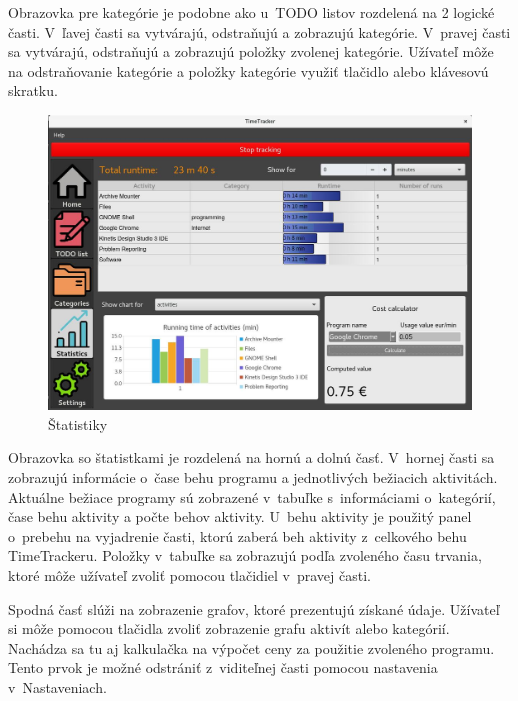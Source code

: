 \documentclass[]{article}
\begin{document}
Obrazovka pre kategórie je podobne ako u~TODO listov rozdelená na 2 logické časti. V~ľavej časti sa vytvárajú, odstraňujú a zobrazujú kategórie. V~pravej časti sa vytvárajú, odstraňujú a zobrazujú položky zvolenej kategórie. Užívateľ môže na odstraňovanie kategórie a položky kategórie využiť tlačidlo alebo klávesovú skratku.

\newpage

\begin{figure}[h!]
	\includegraphics[width=\textwidth]{statistiky}
	\caption{Štatistiky}
\end{figure}

Obrazovka so štatistkami je rozdelená na hornú a dolnú časť. V~hornej časti sa zobrazujú informácie o~čase behu programu a jednotlivých bežiacich aktivitách. Aktuálne bežiace programy sú zobrazené v~tabuľke s~informáciami o~kategórií, čase behu aktivity a počte behov aktivity. U~behu aktivity je použitý panel o~prebehu na vyjadrenie časti, ktorú zaberá beh aktivity z~celkového behu TimeTrackeru. Položky v~tabuľke sa zobrazujú podľa zvoleného času trvania, ktoré môže užívateľ zvoliť pomocou tlačidiel v~pravej časti.

Spodná časť slúži na zobrazenie grafov, ktoré prezentujú získané údaje. Užívateľ si môže pomocou tlačidla zvoliť zobrazenie grafu aktivít alebo kategórií. Nachádza sa tu aj kalkulačka na výpočet ceny za použitie zvoleného programu. Tento prvok je možné odstrániť z~viditeľnej časti pomocou nastavenia v~Nastaveniach.

\newpage
\end{document}

